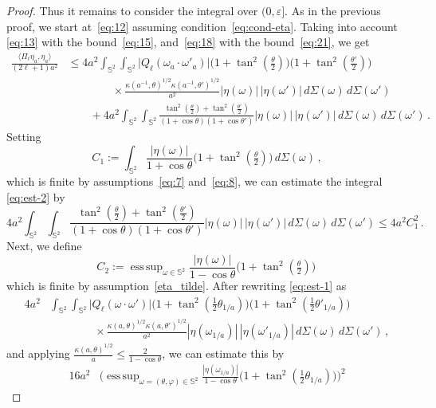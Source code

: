 \documentclass[a4paper,11pt,DIV=11,%
abstract=on%
]{scrartcl}
\DeclareMathOperator*{\esssup}{ess\,sup}
\newcommand{\red}[1]{#1}
\begin{document}
\begin{proof}
	Thus it remains to consider the integral over
        $(0,\varepsilon]$. \red{As in the previous proof, we start at~\eqref{eq:12} assuming
  condition~\eqref{eq:cond-eta}. Taking into 
  account \eqref{eq:13} with the bound~\eqref{eq:15}, and~\eqref{eq:18}
  with the bound~\eqref{eq:21}, we get }
	\begin{align}
		\frac{\langle\Pi_\ell\eta_a,\eta_a\rangle}{(2\ell+1)a^2}
		&\leq 4a^2\int_{\mathbb S^2}\int_{\mathbb S^2}\bigl|Q_\ell(\omega_a\cdot \omega'_a)\bigr|
		\bigl(1+\tan^2(\tfrac{\theta}{2})\bigr)\bigl(1+\tan^2(\tfrac{\theta'}{2})\bigr)
		\nonumber\\
		&\qquad\qquad\times\frac{\kappa(a^{-1},\theta)^{1/2}\kappa(a^{-1},\theta')^{1/2}}{a^2}
		|\eta(\omega)|\,|\eta(\omega')|\,d\Sigma(\omega)\,d\Sigma(\omega')
		\label{eq:est-1}\\
		&\qquad +4a^2\int_{\mathbb S^2}\int_{\mathbb S^2}
		\frac{\tan^2(\tfrac{\theta}{2})+\tan^2(\tfrac{\theta'}{2})}{(1+\cos\theta)(1+\cos\theta')}
		|\eta(\omega)|\,|\eta(\omega')|\,d\Sigma(\omega)\,d\Sigma(\omega')\,.
		\label{eq:est-2}
	\end{align}
	Setting
	$$C_1 :=\int_{\mathbb S^2}\frac{|\eta(\omega)|}{1+\cos\theta}
	\bigl(1+\tan^2(\tfrac\theta2)\bigr)\,d\Sigma(\omega)\,,$$
\red{which is finite by assumptions~\eqref{eq:7} and~\eqref{eq:8},}      
	we can estimate the integral \eqref{eq:est-2} by
	$$4a^2\int_{\mathbb S^2}\int_{\mathbb S^2}
	\frac{\tan^2(\tfrac{\theta}{2})+\tan^2(\tfrac{\theta'}{2})}{(1+\cos\theta)(1+\cos\theta')}
	|\eta(\omega)|\,|\eta(\omega')|\,d\Sigma(\omega)\,d\Sigma(\omega')\leq 4a^2 C_1^2\,.$$
	Next, we define
	$$C_2 :=\esssup_{\omega\in \mathbb S^2}
	\frac{|\eta(\omega)|}{1-\cos\theta}\bigl(1+\tan^2(\tfrac\theta2)\bigr)\,$$
\red{which is finite by assumption~\eqref{eta_tilde}.}       
After rewriting \eqref{eq:est-1} as
	\begin{align*}
		4a^2
		&\int_{\mathbb S^2}\int_{\mathbb S^2}\bigl|Q_\ell(\omega\cdot \omega')\bigr|
		\bigl(1+\tan^2(\tfrac{1}{2}\theta_{1/a})\bigr)\bigl(1+\tan^2(\tfrac{1}{2}\theta'_{1/a})\bigr)
		\nonumber\\
		&\qquad\qquad\times\frac{\kappa(a,\theta)^{1/2}\kappa(a,\theta')^{1/2}}{a^2}
		|\eta(\omega_{1/a})|\,|\eta(\omega'_{1/a})|\,d\Sigma(\omega)\,d\Sigma(\omega')\,,
	\end{align*}
	and applying $\frac{\kappa(a,\theta)^{1/2}}{a}\leq\frac{2}{1-\cos\theta}$,  we can
	estimate this by
	\begin{align*}
		16a^2
		&\biggl(\esssup_{\omega=(\theta,\varphi)\in \mathbb S^2}
		\frac{|\eta(\omega_{1/a})|}{1-\cos\theta}\bigl(1+\tan^2(\tfrac{1}{2}\theta_{1/a})\bigr)\biggr)^2

\end{align*}
\end{proof}
\end{document}
